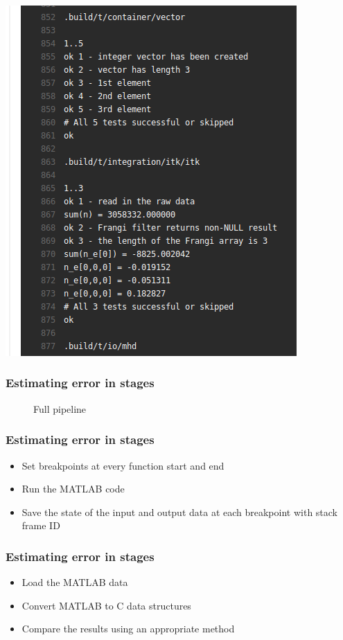 \documentclass{beamer}
\begin{document}
\begin{frame}\frametitle{\subsecname} \centering\includegraphics[height=0.65\textwidth]{gfx/ci-3} \end{frame}

\begin{frame}\frametitle{Estimating error in stages}
\begin{figure}

	\resizebox{0.8\linewidth}{!}{}
	\caption{Full pipeline}
\end{figure}
\end{frame}

\begin{frame}\frametitle{Estimating error in stages}
	\begin{itemize}
	\item<1-> Set breakpoints at every function start and end
	\item<2-> Run the MATLAB code
	\item<3-> Save the state of the input and output data at
		each breakpoint with stack frame ID
	\end{itemize}
\end{frame}

\begin{frame}\frametitle{Estimating error in stages}
	\begin{itemize}
		\item<1-> Load the MATLAB data
		\item<2-> Convert MATLAB to C data structures
		\item<3-> Compare the results using an appropriate method
	\end{itemize}
\end{frame}
\end{document}
